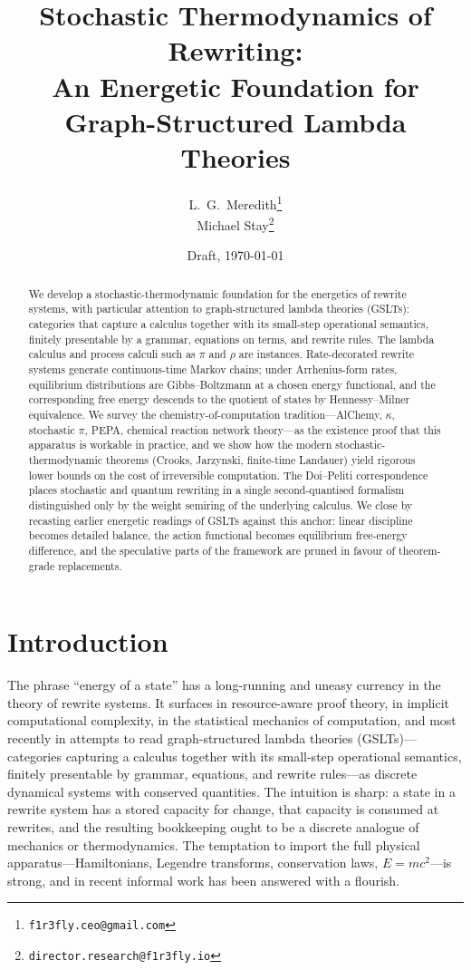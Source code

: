 \documentclass[11pt]{article}
\title{Stochastic Thermodynamics of Rewriting:\\
An Energetic Foundation for Graph-Structured Lambda Theories}
\author{L.\ G.\ Meredith\thanks{\texttt{f1r3fly.ceo@gmail.com}}\\Michael Stay\thanks{\texttt{director.research@f1r3fly.io}}}
\date{Draft, \today}
\theoremstyle{plain}
\theoremstyle{definition}
\theoremstyle{remark}
\begin{document}
\maketitle

\begin{abstract}
We develop a stochastic-thermodynamic foundation for the energetics of rewrite systems, with particular attention to graph-structured lambda theories (GSLTs): categories that capture a calculus together with its small-step operational semantics, finitely presentable by a grammar, equations on terms, and rewrite rules. The lambda calculus and process calculi such as $\pi$ and $\rho$ are instances. Rate-decorated rewrite systems generate continuous-time Markov chains; under Arrhenius-form rates, equilibrium distributions are Gibbs--Boltzmann at a chosen energy functional, and the corresponding free energy descends to the quotient of states by Hennessy--Milner equivalence. We survey the chemistry-of-computation tradition---AlChemy, $\kappa$, stochastic $\pi$, PEPA, chemical reaction network theory---as the existence proof that this apparatus is workable in practice, and we show how the modern stochastic-thermodynamic theorems (Crooks, Jarzynski, finite-time Landauer) yield rigorous lower bounds on the cost of irreversible computation. The Doi--Peliti correspondence places stochastic and quantum rewriting in a single second-quantised formalism distinguished only by the weight semiring of the underlying calculus. We close by recasting earlier energetic readings of GSLTs against this anchor: linear discipline becomes detailed balance, the action functional becomes equilibrium free-energy difference, and the speculative parts of the framework are pruned in favour of theorem-grade replacements.
\end{abstract}

\section{Introduction}

The phrase ``energy of a state'' has a long-running and uneasy currency in the theory of rewrite systems. It surfaces in resource-aware proof theory, in implicit computational complexity, in the statistical mechanics of computation, and most recently in attempts to read graph-structured lambda theories (GSLTs)---categories capturing a calculus together with its small-step operational semantics, finitely presentable by grammar, equations, and rewrite rules---as discrete dynamical systems with conserved quantities. The intuition is sharp: a state in a rewrite system has a stored capacity for change, that capacity is consumed at rewrites, and the resulting bookkeeping ought to be a discrete analogue of mechanics or thermodynamics. The temptation to import the full physical apparatus---Hamiltonians, Legendre transforms, conservation laws, $E = mc^2$---is strong, and in recent informal work has been answered with a flourish.
\end{document}
